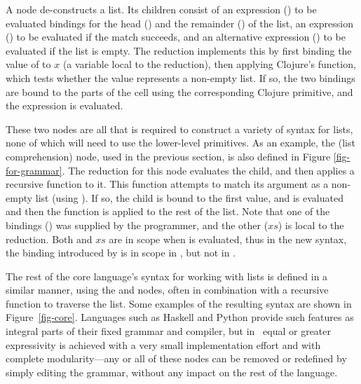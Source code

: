 A  node de-constructs a list. Its children consist of an expression () to be evaluated bindings for the head () and the remainder () of the list, an expression () to be evaluated if the match succeeds, and an alternative expression () to be evaluated if the list is empty. The  reduction implements this by first binding the value of  to $x$ (a variable local to the reduction), then applying Clojure's  function, which tests whether the value represents a non-empty list. If so, the two bindings are bound to the parts of the cell using the corresponding Clojure primitive, and the  expression is evaluated.

These two nodes are all that is required to construct a variety of syntax for lists, none of which will need to use the lower-level primitives. As an example, the  (list comprehension) node, used in the previous section, is also defined in Figure \ref{fig-for-grammar}. The  reduction for this node evaluates the  child, and then applies a recursive function to it. This function attempts to match its argument as a non-empty list (using ). If so, the  child is bound to the first value, and  is evaluated and then the function is applied to the rest of the list. Note that one of the bindings () was supplied by the programmer, and the other ($xs$) is local to the reduction. Both  and $xs$ are in scope when  is evaluated, thus in the new syntax, the binding introduced by  is in scope in , but not in .

The rest of the core language's syntax for working with lists is defined in a similar manner, using the  and  nodes, often in combination with a recursive function to traverse the list. Some examples of the resulting syntax are shown in Figure~\ref{fig-core}. Languages such as Haskell and Python provide such features as integral parts of their fixed grammar and compiler, but in \Meta\ equal or greater expressivity is achieved with a very small implementation effort and with complete modularity---any or all of these nodes can be removed or redefined by simply editing the grammar, without any impact on the rest of the language.


%
%
